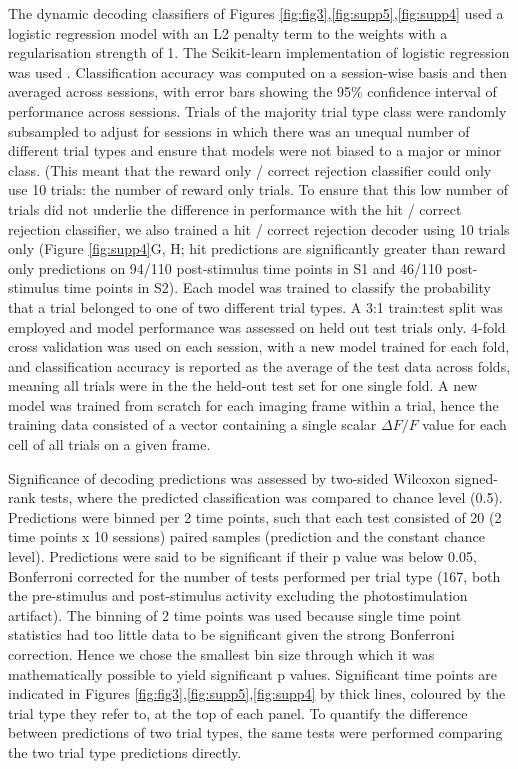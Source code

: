 The dynamic decoding classifiers of Figures \ref{fig:fig3},\ref{fig:supp5},\ref{fig:supp4} used a logistic regression model with an L2 penalty term to the weights with a regularisation strength of 1. The Scikit-learn implementation of logistic regression was used \cite{pedregosa_scikit-learn_2012}. Classification accuracy was computed on a session-wise basis and then averaged across sessions, with error bars showing the 95\% confidence interval of performance across sessions. Trials of the majority trial type class were randomly subsampled to adjust for sessions in which there was an unequal number of different trial types and ensure that models were not biased to a major or minor class. (This meant that the reward only / correct rejection classifier could only use 10 trials: the number of reward only trials. To ensure that this low number of trials did not underlie the difference in performance with the hit / correct rejection classifier, we also trained a hit / correct rejection decoder using 10 trials only (Figure \ref{fig:supp4}G, H; hit predictions are significantly greater than reward only predictions on 94/110 post-stimulus time points in S1 and 46/110 post-stimulus time points in S2). Each model was trained to classify the probability that a trial belonged to one of two different trial types. A 3:1 train:test split was employed and model performance was assessed on held out test trials only. 4-fold cross validation was used on each session, with a new model trained for each fold, and classification accuracy is reported as the average of the test data across folds, meaning all trials were in the the held-out test set for one single fold. A new model was trained from scratch for each imaging frame within a trial, hence the training data consisted of a vector containing a single scalar $\Delta F/F$ value for each cell of all trials on a given frame.

Significance of decoding predictions was assessed by two-sided Wilcoxon signed-rank tests, where the predicted classification was compared to chance level (0.5). Predictions were binned per 2 time points, such that each test consisted of 20 (2 time points x 10 sessions) paired samples (prediction and the constant chance level). Predictions were said to be significant if their p value was below 0.05, Bonferroni corrected for the number of tests performed per trial type (167, both the pre-stimulus and post-stimulus activity excluding the photostimulation artifact). The binning of 2 time points was used because single time point statistics had too little data to be significant given the strong Bonferroni correction. Hence we chose the smallest bin size through which it was mathematically possible to yield significant p values. Significant time points are indicated in Figures \ref{fig:fig3},\ref{fig:supp5},\ref{fig:supp4} by thick lines, coloured by the trial type they refer to, at the top of each panel. To quantify the difference between predictions of two trial types, the same tests were performed comparing the two trial type predictions directly.


